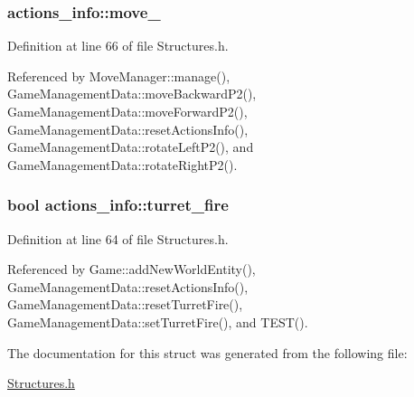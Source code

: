 \hypertarget{structactions__info_adf9ed4a9ad4b604295846d06872e0ebf}{
\subsubsection[{move\-\_\-2}]{ actions\-\_\-info\-::move\-\_}}\label{structactions__info_adf9ed4a9ad4b604295846d06872e0ebf}


Definition at line 66 of file Structures.\-h.



Referenced by Move\-Manager\-::manage(), Game\-Management\-Data\-::move\-Backward\-P2(), Game\-Management\-Data\-::move\-Forward\-P2(), Game\-Management\-Data\-::reset\-Actions\-Info(), Game\-Management\-Data\-::rotate\-Left\-P2(), and Game\-Management\-Data\-::rotate\-Right\-P2().

\hypertarget{structactions__info_afd5886948959786f75255fccbc965154}{
\subsubsection[{turret\-\_\-fire}]{\setlength{\rightskip}{0pt plus 5cm}bool actions\-\_\-info\-::turret\-\_\-fire}}\label{structactions__info_afd5886948959786f75255fccbc965154}


Definition at line 64 of file Structures.\-h.



Referenced by Game\-::add\-New\-World\-Entity(), Game\-Management\-Data\-::reset\-Actions\-Info(), Game\-Management\-Data\-::reset\-Turret\-Fire(), Game\-Management\-Data\-::set\-Turret\-Fire(), and T\-E\-S\-T().



The documentation for this struct was generated from the following file\-:\begin{DoxyCompactItemize}
\item 
\hyperlink{Structures_8h}{Structures.\-h}\end{DoxyCompactItemize}
